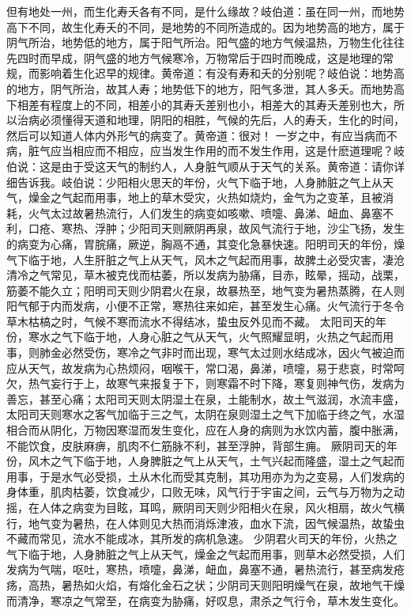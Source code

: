 \documentclass[a4paper,12pt,UTF8,twoside]{ctexbook}
\begin{document}
但有地处一州，而生化寿夭各有不同，是什么缘故？岐伯道：虽在同一州，而地势高下不同，故生化寿夭的不同，是地势的不同所造成的。因为地势高的地方，属于阴气所治，地势低的地方，属于阳气所治。阳气盛的地方气候温热，万物生化往往先四时而早成，阴气盛的地方气候寒冷，万物常后于四时而晚成，这是地理的常规，而影响着生化迟早的规律。黄帝道：有没有寿和夭的分别呢？岐伯说：地势高的地方，阴气所治，故其人寿；地势低下的地方，阳气多泄，其人多夭。而地势高下相差有程度上的不同，相差小的其寿夭差别也小，相差大的其寿夭差别也大，所以治病必须懂得天道和地理，阴阳的相胜，气候的先后，人的寿夭，生化的时间，然后可以知道人体内外形气的病变了。黄帝道：很对！
一岁之中，有应当病而不病，脏气应当相应而不相应，应当发生作用的而不发生作用，这是什麽道理呢？岐伯说：这是由于受这天气的制约人，人身脏气顺从于天气的关系。黄帝道：请你详细告诉我。岐伯说：少阳相火思天的年份，火气下临于地，人身肺脏之气上从天气，燥金之气起而用事，地上的草木受灾，火热如烧灼，金气为之变革，且被消耗，火气太过故暑热流行，人们发生的病变如咳嗽、喷嚏、鼻涕、衄血、鼻塞不利，口疮、寒热、浮肿；少阳司天则厥阴再泉，故风气流行于地，沙尘飞扬，发生的病变为心痛，胃脘痛，厥逆，胸鬲不通，其变化急暴快速。阳明司天的年份，燥气下临于地，人生肝脏之气上从天气，风木之气起而用事，故脾土必受灾害，凄沧清冷之气常见，草木被克伐而枯萎，所以发病为胁痛，目赤，眩晕，摇动，战栗，筋萎不能久立；阳明司天则少阴君火在泉，故暴热至，地气变为暑热蒸腾，在人则阳气郁于内而发病，小便不正常，寒热往来如疟，甚至发生心痛。火气流行于冬令草木枯槁之时，气候不寒而流水不得结冰，蛰虫反外见而不藏。
太阳司天的年份，寒水之气下临于地，人身心脏之气从天气，火气照耀显明，火热之气起而用事，则肺金必然受伤，寒冷之气非时而出现，寒气太过则水结成冰，因火气被迫而应从天气，故发病为心热烦闷，咽喉干，常口渴，鼻涕，喷嚏，易于悲哀，时常呵欠，热气妄行于上，故寒气来报复于下，则寒霜不时下降，寒复则神气伤，发病为善忘，甚至心痛；太阳司天则太阴湿土在泉，土能制水，故土气滋润，水流丰盛，太阳司天则寒水之客气加临于三之气，太阴在泉则湿土之气下加临于终之气，水湿相合而从阴化，万物因寒湿而发生变化，应在人身的病则为水饮内蓄，腹中胀满，不能饮食，皮肤麻痹，肌肉不仁筋脉不利，甚至浮肿，背部生痈。
厥阴司天的年份，风木之气下临于地，人身脾脏之气上从天气，土气兴起而隆盛，湿土之气起而用事，于是水气必受损，土从木化而受其克制，其功用亦为为之变易，人们发病的身体重，肌肉枯萎，饮食减少，口败无味，风气行于宇宙之间，云气与万物为之动摇，在人体之病变为目眩，耳鸣，厥阴司天则少阳相火在泉，风火相扇，故火气横行，地气变为暑热，在人体则见大热而消烁津液，血水下流，因气候温热，故蛰虫不藏而常见，流水不能成冰，其所发的病机急速。
少阴君火司天的年份，火热之气下临于地，人身肺脏之气上从天气，燥金之气起而用事，则草木必然受损，人们发病为气喘，呕吐，寒热，喷嚏，鼻涕，衄血，鼻塞不通，暑热流行，甚至病发疮疡，高热，暑热如火焰，有熔化金石之状；少阴司天则阳明燥气在泉，故地气干燥而清净，寒凉之气常至，在病变为胁痛，好叹息，肃杀之气行令，草木发生变化。
\end{document}
